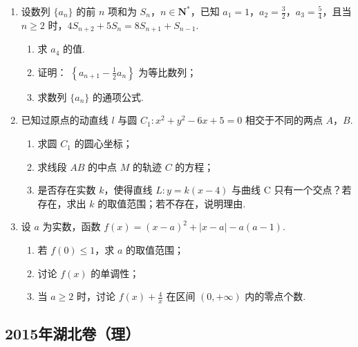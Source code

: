 \begin{description}
\begin{enumerate}[leftmargin=5pt]
        \item 设数列 \(\{a_{n}\}\) 的前 \(n\) 项和为 \(S_{n}\)，\(n \in \mathbf{N}^{*}\)，已知 \(a_{1} = 1\)，\(a_{2} = \frac{3}{2}\)，\(a_{3} = \frac{5}{4}\)，且当 \(n \geqslant 2\) 时，\(4S_{n+2} + 5S_{n} = 8S_{n+1} + S_{n-1}\).
\begin{enumerate}
\item 求 \( a_{4} \) 的值.
\item 证明： \( \left\{a_{n+1}-\frac{1}{2}a_{n}\right\} \) 为等比数列；
\item 求数列 \( \{a_{n}\} \) 的通项公式.
\end{enumerate}

        \item 已知过原点的动直线 \(l\) 与圆 \(C_1: x^2 + y^2 - 6x + 5 = 0\) 相交于不同的两点 \(A\)，\(B\).
\begin{enumerate}
\item 求圆 \(C_1\) 的圆心坐标；
\item 求线段 \(AB\) 的中点 \(M\) 的轨迹 \(C\) 的方程；
\item 是否存在实数 \(k\)，使得直线 \(L: y = k(x - 4)\) 与曲线 C 只有一个交点？若存在，求出 \(k\) 的取值范围；若不存在，说明理由.
\end{enumerate}

        \item 设 \(a\) 为实数，函数 \(f(x) = (x - a)^2 + |x - a| - a(a - 1)\).
\begin{enumerate}
\item 若 \( f(0) \leqslant 1 \)，求 \( a \) 的取值范围；
\item 讨论 \( f(x) \) 的单调性；
\item 当 \(a \geqslant 2\) 时，讨论 \(f(x) + \frac{4}{x}\) 在区间 \((0, +\infty)\) 内的零点个数.
\end{enumerate}

    \end{enumerate}

\end{description}


\subsection{2015年湖北卷（理）}\label{gk:2015年湖北卷（理）}

